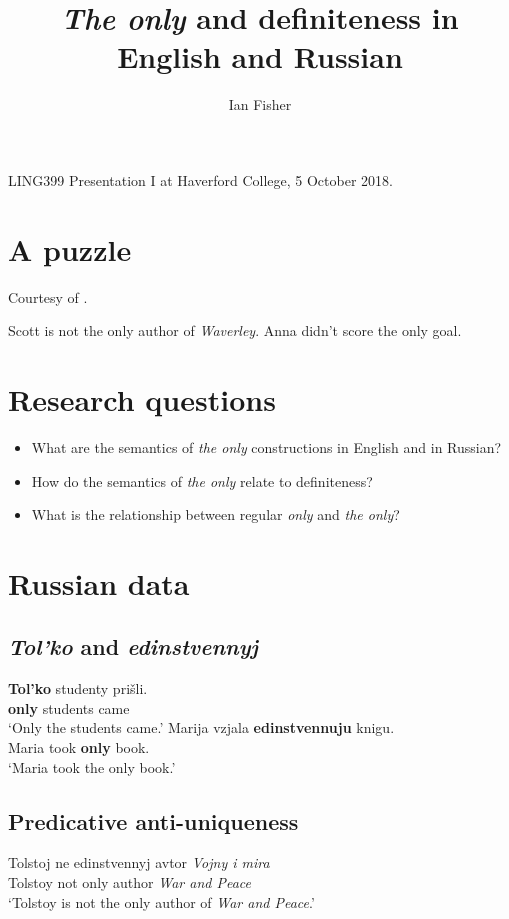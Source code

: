\documentclass{article}
\title{\textit{The only} and definiteness in English and Russian}
\author{Ian Fisher}
\date{}
\begin{document}
\maketitle

\noindent LING399 Presentation I at Haverford College, 5 October 2018.

\section{A puzzle}
Courtesy of \citet{cb2015}.

\begin{exe}
	\ex Scott is not the only author of \textit{Waverley}.
	\ex Anna didn't score the only goal.
\end{exe}

\section{Research questions}
\begin{itemize}
	\item What are the semantics of \textit{the only} constructions in English and in Russian?
	\item How do the semantics of \textit{the only} relate to definiteness?
	\item What is the relationship between regular \textit{only} and \textit{the only}?
\end{itemize}

\section{Russian data}
\subsection*{\textit{Tol'ko} and \textit{edinstvennyj}}
\begin{exe}
	\ex \gll \textbf{Tol'ko} studenty pri\v{s}li.\\
	\textbf{only} students came\\
	\glt `Only the students came.'
	\ex \gll Marija vzjala \textbf{edinstvennuju} knigu.\\
	Maria took \textbf{only} book.\\
	\glt `Maria took the only book.'
\end{exe}

\subsection*{Predicative anti-uniqueness}
\begin{exe}
	\ex \gll Tolstoj ne edinstvennyj avtor \textit{Vojny i mira}\\
	Tolstoy not only author \textit{War and Peace}\\
	\glt `Tolstoy is not the only author of \textit{War and Peace}.'
\end{exe}
\end{document}
